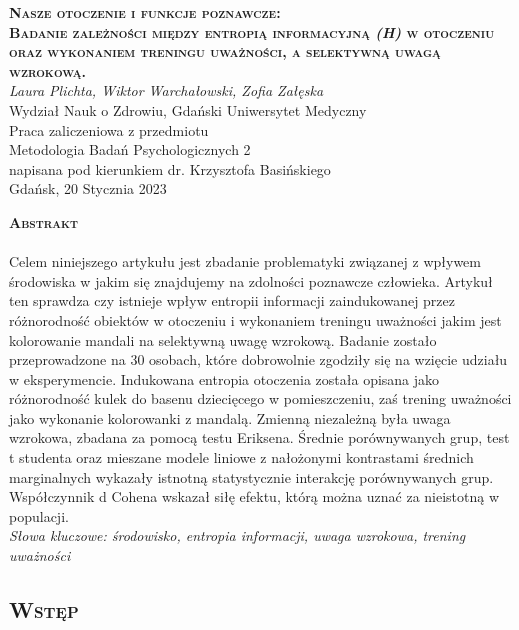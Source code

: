 \documentclass[12pt,a4paper,final,oneside,onecolumn,titlepage]{article}
\begin{document}
\pagestyle{fancy}
\fancyhead{}
\fancyfoot{}
\rhead{\thepage}

\begin{titlepage}
  \thispagestyle{empty}
  \rhead{\thepage}
  \begin{center}
  \vspace*{1cm}
  \Large
  \textbf{\textsc{Nasze otoczenie i funkcje poznawcze:\\ Badanie zależności między entropią informacyjną \textit{(H)} w otoczeniu oraz wykonaniem treningu uważności, a selektywną uwagą wzrokową.\\}}
  \vspace{1.5cm}
  \textit{Laura Plichta, Wiktor Warchałowski, Zofia Załęska\\}
  Wydział Nauk o Zdrowiu, Gdański Uniwersytet Medyczny\\
  \vspace{3cm}
  Praca zaliczeniowa z przedmiotu \\ Metodologia Badań Psychologicznych 2 \\ napisana pod kierunkiem dr. Krzysztofa Basińskiego\\
  \vspace{3cm}
  Gdańsk, 20 Stycznia 2023
  \end{center}
\end{titlepage}
\begin{center}
  \vspace*{0.5cm}
  \large{\textbf{\textsc{Abstrakt}}}
\end{center}
\paragraph{}
Celem niniejszego artykułu jest zbadanie problematyki związanej z wpływem środowiska w jakim się znajdujemy na zdolności poznawcze człowieka. Artykuł ten sprawdza czy istnieje wpływ entropii informacji zaindukowanej przez różnorodność obiektów w otoczeniu i wykonaniem treningu uważności jakim jest kolorowanie mandali na selektywną uwagę wzrokową. Badanie zostało przeprowadzone na 30 osobach, które dobrowolnie zgodziły się na wzięcie udziału w eksperymencie. Indukowana entropia otoczenia została opisana jako różnorodność kulek do basenu dziecięcego w pomieszczeniu, zaś trening uważności jako wykonanie kolorowanki z mandalą. Zmienną niezależną była uwaga wzrokowa, zbadana za pomocą testu Eriksena. Średnie porównywanych grup, test t studenta oraz mieszane modele liniowe z nałożonymi kontrastami średnich marginalnych wykazały istnotną statystycznie interakcję porównywanych grup. Współczynnik d Cohena wskazał siłę efektu, którą można uznać za nieistotną w populacji.
\\
\textit{Słowa kluczowe: środowisko, entropia informacji, uwaga wzrokowa, trening uważności}
\newpage
\begin{center}
\section*{\large{\textbf{\textsc{Wstęp}}}}
\end{center}
\end{document}
